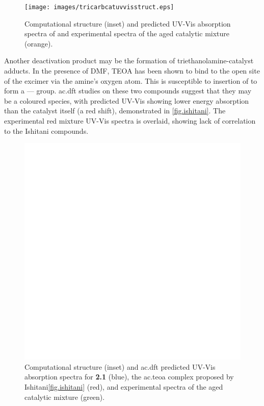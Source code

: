 \begin{figure}[!htbp]
 \begin{center}
  \texttt{[image: images/tricarbcatuvvisstruct.eps]}
 \end{center}
 \caption[Structure and absorption spectra of proposed .]{Computational structure (inset) and predicted UV-Vis absorption spectra of  and experimental spectra of the aged catalytic mixture (orange).}
 \label{fig.uvvistricarb}
\end{figure}

Another deactivation product may be the formation of triethanolamine-catalyst adducts\autocite{morimoto2013}. In the presence of DMF, TEOA has been shown to bind to the open site of the excimer via the amine's oxygen atom. This is susceptible to insertion of  to form a ---- group. \Gls{ac.dft} studies on these two compounds suggest that they may be a coloured species, with predicted UV-Vis showing lower energy absorption than the catalyst itself (a red shift), demonstrated in \autoref{fig.ishitani}. The experimental red mixture UV-Vis spectra is overlaid, showing lack of correlation to the Ishitani compounds.

\begin{figure}[!htbp]
 \begin{center}
  \includegraphics[clip=true, keepaspectratio, width=120mm]{images/ishitani.eps}
 \end{center}
\caption[Structure and absorption spectra of the catalyst-TEOA complex.]{Computational structure (inset) and \gls{ac.dft} predicted UV-Vis absorption spectra for \textbf{2.1} (blue), the \gls{ac.teoa} complex proposed by Ishitani\autoref{fig.ishitani} (red), and experimental spectra of the aged catalytic mixture (green).}
\label{fig.ishitani}
\end{figure}

